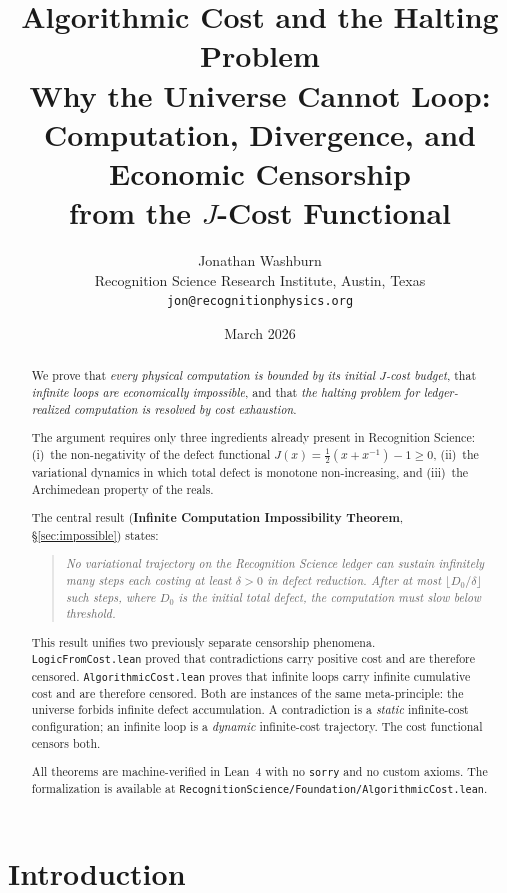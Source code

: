 \documentclass[11pt,a4paper]{article}
\title{\textbf{Algorithmic Cost and the Halting Problem}\\[0.5em]
\large Why the Universe Cannot Loop:\\
Computation, Divergence, and Economic Censorship\\
from the $J$-Cost Functional}
\author{Jonathan Washburn\\
\small Recognition Science Research Institute, Austin, Texas\\
\small \texttt{jon@recognitionphysics.org}}
\date{March 2026}
\theoremstyle{plain}
\theoremstyle{definition}
\theoremstyle{remark}
\newcommand{\Jcost}{J}
\begin{document}
\maketitle

\begin{abstract}
We prove that \emph{every physical computation is bounded by its initial $\Jcost$-cost budget}, that \emph{infinite loops are economically impossible}, and that \emph{the halting problem for ledger-realized computation is resolved by cost exhaustion}.

The argument requires only three ingredients already present in Recognition Science:
(i)~the non-negativity of the defect functional $\Jcost(x) = \tfrac{1}{2}(x + x^{-1}) - 1 \ge 0$,
(ii)~the variational dynamics in which total defect is monotone non-increasing,
and (iii)~the Archimedean property of the reals.

The central result (\textbf{Infinite Computation Impossibility Theorem}, \S\ref{sec:impossible}) states:

\begin{quote}
\itshape
No variational trajectory on the Recognition Science ledger can sustain infinitely many steps each costing at least $\delta > 0$ in defect reduction. After at most $\lfloor D_0/\delta \rfloor$ such steps, where $D_0$ is the initial total defect, the computation must slow below threshold.
\end{quote}

This result unifies two previously separate censorship phenomena.
\texttt{LogicFromCost.lean} proved that contradictions carry positive cost and are therefore censored.
\texttt{AlgorithmicCost.lean} proves that infinite loops carry infinite cumulative cost and are therefore censored.
Both are instances of the same meta-principle: the universe forbids infinite defect accumulation.
A contradiction is a \emph{static} infinite-cost configuration; an infinite loop is a \emph{dynamic} infinite-cost trajectory.
The cost functional censors both.

All theorems are machine-verified in Lean~4 with no \texttt{sorry} and no custom axioms.
The formalization is available at \texttt{RecognitionScience/Foundation/AlgorithmicCost.lean}.
\end{abstract}

\tableofcontents
\newpage

\section{Introduction}\label{sec:intro}
\end{document}
